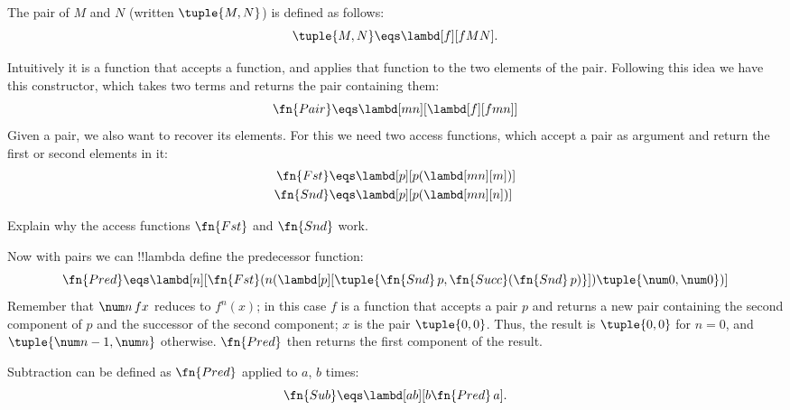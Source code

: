 \documentclass[../../../include/open-logic-section]{subfiles}
\begin{document}

\begin{defn}
The pair of $M$ and $N$ (written $\tuple{M,N}$) is defined as follows:
\[
\tuple{M,N} \eqs \lambd[f][fMN].
\]
\end{defn}
  
Intuitively it is a function that accepts a function, and applies that
function to the two elements of the pair. Following this idea we have
this constructor, which takes two terms and returns the pair containing
them:
\[
  \fn{Pair} \eqs \lambd[mn][\lambd[f][fmn]]
\]
Given a pair, we also want to recover its elements.
For this we need two access functions, which accept a pair as argument and
return the first or second elements in it:
\begin{align*}
  \fn{Fst} &\eqs \lambd[p][p(\lambd[mn][m])]\\
  \fn{Snd} &\eqs \lambd[p][p(\lambd[mn][n])]
\end{align*}

\begin{prob}
  Explain why the access functions $\fn{Fst}$ and $\fn{Snd}$ work.
\end{prob}

Now with pairs we can !!{lambda define} the predecessor function:
\[
  \fn{Pred} \eqs \lambd[n][\fn{Fst}(n (\lambd[p][\tuple{\fn{Snd}\, {p}, \fn{Succ}(\fn{Snd}\, {p})}]) \tuple{\num 0, \num 0})]
\]
Remember that $\num n\, f x$ reduces to $f^{n}(x)$; in this
case $f$ is a function that accepts a pair $p$ and returns a new
pair containing the second component of $p$ and the successor of the
second component; $x$ is the pair $\tuple{0,0}$. Thus, the
result is $\tuple{0,0}$ for $n=0$, and $\tuple{{\num n-1}, \num n}$
otherwise. $\fn{Pred}$ then returns the first component of the result.

Subtraction can be defined as $\fn{Pred}$ applied to $a$, $b$ times:
\[
\fn{Sub} \eqs \lambd[ab][b \fn{Pred}\, a].
\]
    
\end{document}
